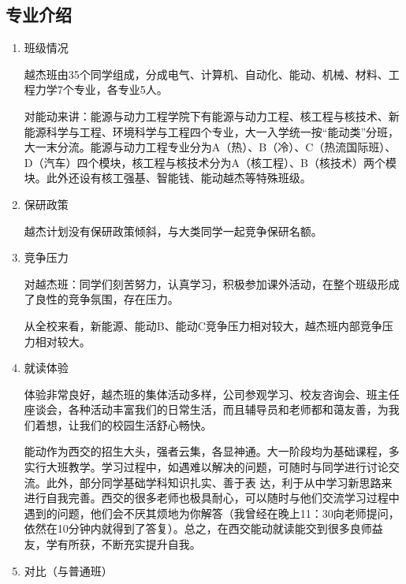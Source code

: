 \documentclass[zihao=-4,fontset=none]{Beautybook-CN}
\begin{document}
\subsection{专业介绍}

\begin{enumerate}
			
	\item 班级情况
	      	      	      
	      越杰班由35个同学组成，分成电气、计算机、自动化、能动、机械、材料、工程力学7个专业，各专业5人。
	      	      
	      对能动来讲：能源与动力工程学院下有能源与动力工程、核工程与核技术、新能源科学与工程、环境科学与工程四个专业，大一入学统一按“能动类”分班，大一末分流。能源与动力工程专业分为A（热）、B（冷）、C（热流国际班）、D（汽车）四个模块，核工程与核技术分为A（核工程）、B（核技术）两个模块。此外还设有核工强基、智能钱、能动越杰等特殊班级。
	      	      	      
	\item 保研政策
	      	      	      
	      越杰计划没有保研政策倾斜，与大类同学一起竞争保研名额。
	      	      	      
	\item 竞争压力
	      	      	      
	      对越杰班：同学们刻苦努力，认真学习，积极参加课外活动，在整个班级形成了良性的竞争氛围，存在压力。
	      
	      从全校来看，新能源、能动B、能动C竞争压力相对较大，越杰班内部竞争压力相对较大。
	      	      	      
	\item 就读体验
	      	      	      
	      体验非常良好，越杰班的集体活动多样，公司参观学习、校友咨询会、班主任座谈会，各种活动丰富我们的日常生活，而且辅导员和老师都和蔼友善，为我们着想，让我们的校园生活舒心畅快。
	      	      
	      能动作为西交的招生大头，强者云集，各显神通。大一阶段均为基础课程，多实行大班教学。学习过程中，如遇难以解决的问题，可随时与同学进行讨论交流。此外，部分同学基础学科知识扎实、善于表 达，利于从中学习新思路来进行自我完善。西交的很多老师也极具耐心，可以随时与他们交流学习过程中遇到的问题，他们会不厌其烦地为你解答（我曾经在晚上11：30向老师提问，依然在10分钟内就得到了答复）。总之，在西交能动就读能交到很多良师益友，学有所获，不断充实提升自我。
	      	      	      
	\item 对比（与普通班）
	      	      	      

\end{enumerate}
\end{document}
